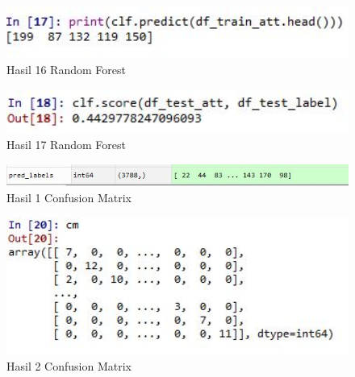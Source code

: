 \begin{figure}[ht]
	\centerline{\includegraphics[width=1\textwidth]{figures/huda/chapter3_praktek/20.JPG}}
	\caption{Hasil 16 Random Forest}
	\label{h24}
\end{figure}

\begin{figure}[ht]
	\centerline{\includegraphics[width=1\textwidth]{figures/huda/chapter3_praktek/21.JPG}}
	\caption{Hasil 17 Random Forest}
	\label{h25}
\end{figure}

\begin{figure}[ht]
	\centerline{\includegraphics[width=1\textwidth]{figures/huda/chapter3_praktek/22.JPG}}
	\caption{Hasil 1 Confusion Matrix}
	\label{h26}
\end{figure}

\begin{figure}[ht]
	\centerline{\includegraphics[width=1\textwidth]{figures/huda/chapter3_praktek/23.JPG}}
	\caption{Hasil 2 Confusion Matrix}
	\label{h27}
\end{figure}


